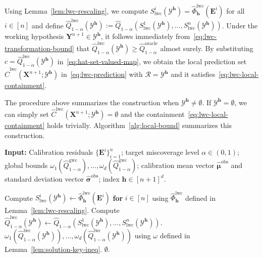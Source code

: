 Using Lemma~\ref{lem:lwc-rescaling}, we compute $S^i_{\mathrm{lwc}}(\mathcal{Y}^{\mathbf{h}})= \hat{\Phi}^{\mathrm{lwc}}_{\mathbf{h}}(\mathbf{E}^i)$ for all $i\in [n]$ and define $\hat{Q}^{\mathrm{lwc}}_{1-\alpha}(\mathcal{Y}^{\mathbf{h}}):= \hat{Q}_{1-\alpha}(S^1_{\mathrm{lwc}}(\mathcal{Y}^{\mathbf{h}}), \ldots, S^n_{\mathrm{lwc}}(\mathcal{Y}^{\mathbf{h}}))$. Under the working hypothesis $\mathbf{Y}^{n+1} \in \mathcal{Y}^{\mathbf{h}}$, it follows immediately from~\eqref{eq:lwc-transformation-bound} that
$\hat{Q}^{\mathrm{lwc}}_{1-\alpha}(\mathcal{Y}^{\mathbf{h}})\ge \hat{Q}^{\mathrm{oracle}}_{1-\alpha}$ almost surely.
By substituting $c = \hat{Q}^{\mathrm{lwc}}_{1-\alpha}(\mathcal{Y}^{\mathbf{h}})$ in~\eqref{eq:hat-set-valued-map}, we obtain the local prediction set $\hat{C}^{\mathrm{lwc}}(\mathbf{X}^{n+1};\mathcal{Y}^{\mathbf{h}})$ in~\eqref{eq:lwc-prediction} with $\mathcal{R} = \mathcal{Y}^{\mathbf{h}}$ and it satisfies~\eqref{eq:lwc-local-containment}.

The procedure above summarizes the construction when $\mathcal{Y}^{\mathbf{h}} \neq \emptyset$.
If $\mathcal{Y}^{\mathbf{h}} = \emptyset$, we can simply set $\hat{C}^{\mathrm{lwc}}(\mathbf{X}^{n+1};\mathcal{Y}^{\mathbf{h}}) = \emptyset$ and the containment~\eqref{eq:lwc-local-containment} holds trivially.
Algorithm~\ref{alg:local-bound} summarizes this construction. 

\begin{algorithm}[!htbp] 
\caption{Construction of local prediction sets under working hypothesis $\mathbf{Y}^{n+1} \in \mathcal{Y}^{\mathbf{h}}$} \label{alg:local-bound}
\textbf{Input:} Calibration residuals $\{\mathbf{E}^i\}_{i=1}^{n}$; target miscoverage level $\alpha\in(0,1)$; global bounds $\omega_1(\hat{Q}^{\mathrm{gwc}}_{1-\alpha}),\ldots,\omega_d(\hat{Q}^{\mathrm{gwc}}_{1-\alpha})$; calibration mean vector $\hat{\boldsymbol\mu}^{\mathrm{obs}}$ and standard deviation vector $\hat{\boldsymbol\sigma}^{\mathrm{obs}}$; index $\mathbf{h}\in [n+1]^d$.
\begin{algorithmic}[1] 
    \State Compute $S_{\mathrm{lwc}}^i(\mathcal{Y}^{\mathbf{h}}) \gets \hat{\Phi}^{\mathrm{lwc}}_{\mathbf{h}}(\mathbf{E}^i)$ \textbf{for} $i \in [n]$ using $\hat{\Phi}^{\mathrm{lwc}}_{\mathbf{h}}$ defined in Lemma~\ref{lem:lwc-rescaling}.
    \State Compute $\hat{Q}^{\mathrm{lwc}}_{1-\alpha}(\mathcal{Y}^{\mathbf{h}}) \gets \hat{Q}_{1-\alpha}(S_{\mathrm{lwc}}^1(\mathcal{Y}^{\mathbf{h}}),\ldots,S_{\mathrm{lwc}}^n(\mathcal{Y}^{\mathbf{h}}))$.
    \State \Return $\omega_1(\hat{Q}^{\mathrm{lwc}}_{1-\alpha}(\mathcal{Y}^{\mathbf{h}})),\ldots,\omega_d(\hat{Q}^{\mathrm{lwc}}_{1-\alpha}(\mathcal{Y}^{\mathbf{h}}))$ using $\omega$ defined in Lemma~\ref{lem:solution-key-ineq}.
\Else
\State \Return $\emptyset$.
\EndIf 
\end{algorithmic} 
\end{algorithm}

